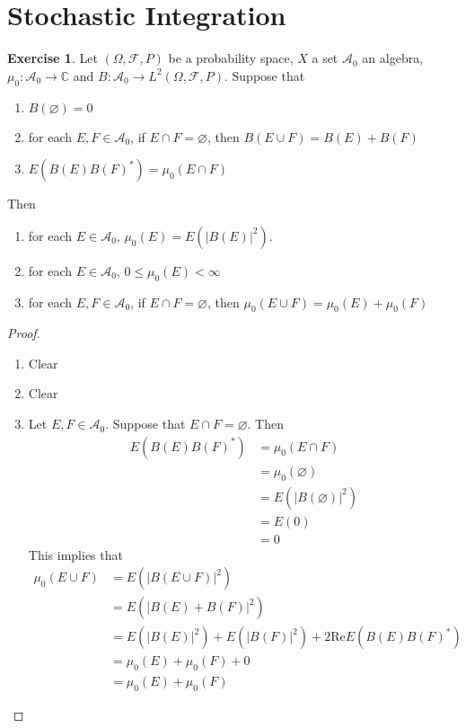 \documentclass[12pt]{amsart}
\theoremstyle{definition}
\newtheorem{ex}[definition]{Exercise}
\newcommand{\Om}{\Omega}
\newcommand{\C}{\mathbb{C}}
\newcommand{\MA}{\mathcal{A}}
\newcommand{\MF}{\mathcal{F}}
\renewcommand{\Re}{\text{Re}}
\begin{document}
	
	
	
	
	
	
	
	
	
	
	
	
	
	
	
	
	
	
	
	
	
	\newpage
	\section{Stochastic Integration}
	\begin{ex}
	Let $(\Om, \MF, P)$ be a probability space, $X$ a set $\MA_0$ an algebra, $\mu_0:\MA_0 \rightarrow \C$ and $B:\MA_0 \rightarrow L^2(\Om, \MF, P)$. 
	Suppose that 
	\begin{enumerate}
	\item $B(\varnothing) = 0$
	\item for each $E, F \in \MA_0$, if $E \cap F = \varnothing$, then $B(E \cup F) = B(E) + B(F)$
	\item $E(B(E)B(F)^*) = \mu_0(E \cap F)$
	\end{enumerate}
	Then 
	\begin{enumerate}
	\item for each $E \in \MA_0$, $\mu_0(E) = E(|B(E)|^2)$.
	\item for each $E \in \MA_0$, $0 \leq \mu_0(E) < \infty$ 
	\item for each $E, F \in \MA_0$, if $E \cap F = \varnothing$, then $\mu_0(E \cup F) = \mu_0(E) + \mu_0(F)$
	\end{enumerate}
	\end{ex}
	
	\begin{proof}\
	\begin{enumerate}
	\item Clear 
	\item Clear
	\item Let $E, F \in \MA_0$. Suppose that $E \cap F = \varnothing$. Then 
	\begin{align*}
	E(B(E)B(F)^*) 
	&= \mu_0(E \cap F) \\
	&= \mu_0(\varnothing) \\
	&= E(|B(\varnothing)|^2) \\
	&= E(0) \\
	&= 0
	\end{align*}
	This implies that 
	\begin{align*}
	\mu_0(E \cup F) 
	&= E(|B(E \cup F)|^2) \\
	&= E(|B(E) + B(F)|^2) \\
	&= E(|B(E)|^2) + E(|B(F)|^2) + 2 \Re E(B(E)B(F)^*) \\
	&= \mu_0(E) + \mu_0(F) +0  \\
	&=  \mu_0(E) + \mu_0(F) 
	\end{align*}
	\end{enumerate}
	\end{proof}
	
\end{document}

